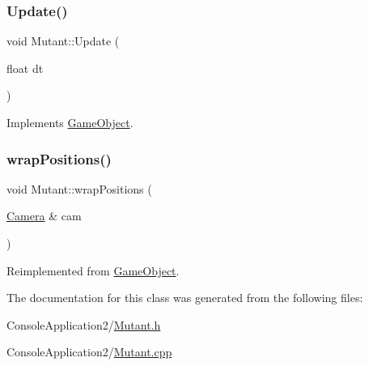 \subsubsection{\texorpdfstring{Update()}{Update()}}
{\footnotesize\ttfamily void Mutant\+::\+Update (\begin{DoxyParamCaption}\item[{float}]{dt }\end{DoxyParamCaption})\hspace{0.3cm}{\ttfamily [virtual]}}



Implements \hyperlink{class_game_object_a93ed63df640deb516a020530e7f8e045}{Game\+Object}.

\hypertarget{class_mutant_a3bc5b923cb3605ddd10a5064ec904d29}{}\label{class_mutant_a3bc5b923cb3605ddd10a5064ec904d29} 
\subsubsection{\texorpdfstring{wrap\+Positions()}{wrapPositions()}}
{\footnotesize\ttfamily void Mutant\+::wrap\+Positions (\begin{DoxyParamCaption}\item[{\hyperlink{class_camera}{Camera} \&}]{cam }\end{DoxyParamCaption})\hspace{0.3cm}{\ttfamily [virtual]}}



Reimplemented from \hyperlink{class_game_object_a53b129d55688652e25e6515d80e669ca}{Game\+Object}.



The documentation for this class was generated from the following files\+:\begin{DoxyCompactItemize}
\item 
Console\+Application2/\hyperlink{_mutant_8h}{Mutant.\+h}\item 
Console\+Application2/\hyperlink{_mutant_8cpp}{Mutant.\+cpp}\end{DoxyCompactItemize}
